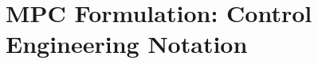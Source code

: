 \documentclass[10pt]{article}
\newcommand{\lrp}[1]{\ensuremath{\left( #1 \right)}}
\begin{document}

\section{MPC Formulation: Control Engineering Notation}\label{sec:control_notation}
\end{document}
